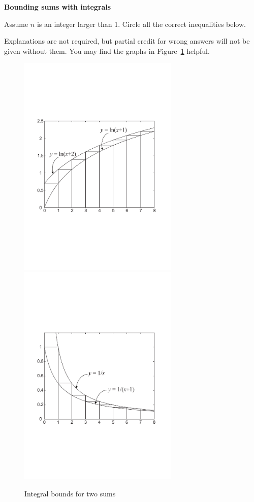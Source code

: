 \documentclass[12pt,twoside]{article}
\begin{document}
\begin{problem}{20}
\textbf{Bounding sums with integrals} 

Assume $n$ is an integer larger than 1.  Circle all the correct inequalities below. 

Explanations are not required, but partial credit for wrong answers
will not be given without them. You may find the graphs in Figure~\ref{integrals_1overx_logx} helpful. 

\begin{figure}
\includegraphics[width=3in,clip]{mq-integral1}
\includegraphics[width=3in,clip]{mq-integral2}
\caption{Integral bounds for two sums}
\label{integrals_1overx_logx}
\end{figure}


\end{problem}
\end{document}
